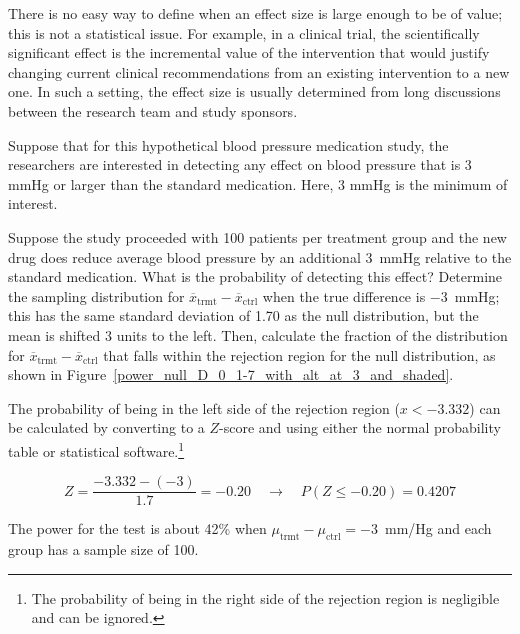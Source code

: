 There is no easy way to define when an effect size is large enough to be of value; this is not a statistical issue. For example, in a clinical trial, the scientifically significant effect is the incremental value of the intervention that would justify changing current clinical recommendations from an existing intervention to a new one. In such a setting, the effect size is usually determined from long discussions between the research team and study sponsors. 

Suppose that for this hypothetical blood pressure medication study, the researchers are interested in detecting any effect on blood pressure that is 3 mmHg or larger than the standard medication. Here, 3 mmHg is the minimum  of interest. 

\begin{examplewrap}
\begin{nexample}{Suppose the study proceeded with 100 patients per treatment group and the new drug does reduce average blood pressure by an additional 3~mmHg relative to the standard medication. What is the probability of detecting this effect?}\label{PowerFor100AtNeg3}%
Determine the sampling distribution for $\overline{x}_{\text{trmt}} - \overline{x}_{\text{ctrl}}$ when the true difference is $-3$~mmHg; this has the same standard deviation of 1.70 as the null distribution, but the mean is shifted 3 units to the left. Then, calculate the fraction of the distribution for $\overline{x}_{\text{trmt}} - \overline{x}_{\text{ctrl}}$ that falls within the rejection region for the null distribution, as shown in Figure~\ref{power_null_D_0_1-7_with_alt_at_3_and_shaded}.

The probability of being in the left side of the rejection region ($x < -3.332$) can be calculated by converting to a $Z$-score and using either the normal probability table or statistical software.\footnote{The probability of being in the right side of the rejection region is negligible and can be ignored.}

\[
	Z = \frac{-3.332 - (-3)}{1.7}= -0.20 \quad \to \quad P(Z \leq -0.20) = 0.4207
\]

The power for the test is about 42\% when $\mu_{\text{trmt}} - \mu_{\text{ctrl}} = -3$~mm/Hg and each group has a sample size of 100.
\end{nexample}
\end{examplewrap}

